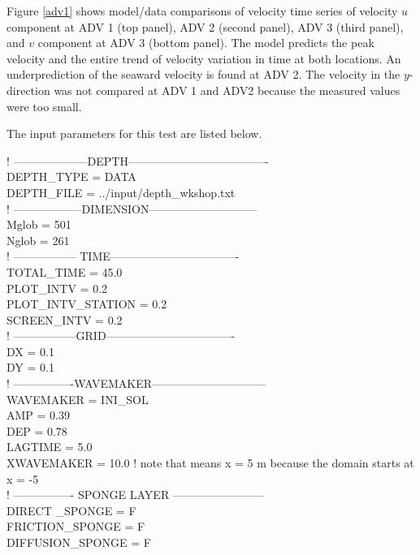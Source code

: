\documentclass[11pt]{article}
\begin{document}
Figure   \ref{adv1} shows model/data comparisons of  velocity time series   of velocity $u$ component at ADV 1 (top panel), ADV 2 (second panel), ADV 3 (third panel), and $v$ component at ADV 3 (bottom panel). 
The model predicts the peak velocity and the entire trend of velocity variation in time at both locations. An underprediction of the seaward velocity is found at ADV 2. The velocity in the $y$-direction was not compared at ADV 1 and ADV2 because the measured values were too small.  

The input parameters for this test are listed below.


\vspace*{0.5cm}
  ! --------------------DEPTH-------------------------------------\\
  DEPTH\_TYPE = DATA\\
DEPTH\_FILE = ../input/depth\_wkshop.txt\\

  ! ------------------DIMENSION-----------------------------\\
Mglob = 501\\
Nglob = 261\\

  ! ----------------- TIME----------------------------------\\
TOTAL\_TIME = 45.0\\
PLOT\_INTV = 0.2\\
PLOT\_INTV\_STATION = 0.2\\
SCREEN\_INTV = 0.2  \\

  ! -----------------GRID----------------------------------\\
DX = 0.1\\
DY = 0.1\\
  
   ! ----------------WAVEMAKER------------------------------\\
WAVEMAKER = INI\_SOL\\
AMP = 0.39\\
DEP = 0.78\\
LAGTIME = 5.0\\
XWAVEMAKER = 10.0  ! note that means x = 5 m because the domain starts at x = -5\\

  ! ---------------- SPONGE LAYER ------------------------\\
DIRECT \_SPONGE = F\\
FRICTION\_SPONGE = F \\
DIFFUSION\_SPONGE = F \\
\end{document}
